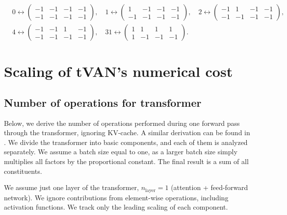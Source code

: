 \documentclass[3p, times,merge]{elsarticle}
\begin{document}
\begin{equation*}
\begin{split}
&0 \leftrightarrow{}
\begin{pmatrix}
-1 & -1 & -1 & -1\\
-1 & -1 & -1 & -1
\end{pmatrix}, \quad
 1 \leftrightarrow{}
\begin{pmatrix}
1 & -1 & -1 & -1\\
-1 & -1 & -1 & -1
\end{pmatrix},\quad
2 \leftrightarrow{} 
\begin{pmatrix}
-1 & 1 & -1 & -1\\
-1 & -1 & -1 & -1
\end{pmatrix}, \quad \\
&4 \leftrightarrow{}
\begin{pmatrix}
-1 & -1 & 1 & -1\\
-1 & -1 & -1 & -1
\end{pmatrix},\quad
31 \leftrightarrow{} 
\begin{pmatrix}
1 & 1 & 1 & 1\\
1 & -1 & -1 & -1
\end{pmatrix}.
\end{split}
\end{equation*}




\section{Scaling of tVAN's numerical cost}
\label{scaling_appendix}


\subsection{Number of operations for transformer}
\label{scaling_derivation_details}

Below, we derive the number of operations performed during one forward pass through the transformer, ignoring KV-cache. A similar derivation can be found in \cite{scaling-book}. We divide the transformer into basic components, and each of them is analyzed separately. We assume a batch size equal to one, as a larger batch size simply multiplies all factors by the proportional constant. The final result is a sum of all constituents.

We assume just one layer of the transformer, $n_\text{layer}=1$ (attention + feed-forward network).
We ignore contributions from element-wise operations, including activation functions. We track only the leading scaling of each component.
\end{document}
